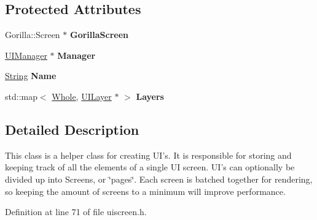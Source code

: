 \subsection*{Protected Attributes}
\begin{DoxyCompactItemize}
\item 
\hypertarget{classphys_1_1UIScreen_a6cc0cb1a19c2b2a8cee20222d1af333c}{
Gorilla::Screen $\ast$ {\bfseries GorillaScreen}}
\label{d9/de8/classphys_1_1UIScreen_a6cc0cb1a19c2b2a8cee20222d1af333c}

\item 
\hypertarget{classphys_1_1UIScreen_a8cb86a27b0ac39426ae23e67e34ebd47}{
\hyperlink{classphys_1_1UIManager}{UIManager} $\ast$ {\bfseries Manager}}
\label{d9/de8/classphys_1_1UIScreen_a8cb86a27b0ac39426ae23e67e34ebd47}

\item 
\hypertarget{classphys_1_1UIScreen_a513aebb318ba6e21fcc95090c4385614}{
\hyperlink{namespacephys_aa03900411993de7fbfec4789bc1d392e}{String} {\bfseries Name}}
\label{d9/de8/classphys_1_1UIScreen_a513aebb318ba6e21fcc95090c4385614}

\item 
\hypertarget{classphys_1_1UIScreen_aab6876d055853ed554e1ab09d0e91ce0}{
std::map$<$ \hyperlink{namespacephys_a460f6bc24c8dd347b05e0366ae34f34a}{Whole}, \hyperlink{classphys_1_1UILayer}{UILayer} $\ast$ $>$ {\bfseries Layers}}
\label{d9/de8/classphys_1_1UIScreen_aab6876d055853ed554e1ab09d0e91ce0}

\end{DoxyCompactItemize}


\subsection{Detailed Description}
This class is a helper class for creating UI's. It is responsible for storing and keeping track of all the elements of a single UI screen. UI's can optionally be divided up into Screens, or \char`\"{}pages\char`\"{}. Each screen is batched together for rendering, so keeping the amount of screens to a minimum will improve performance. 

Definition at line 71 of file uiscreen.h.



